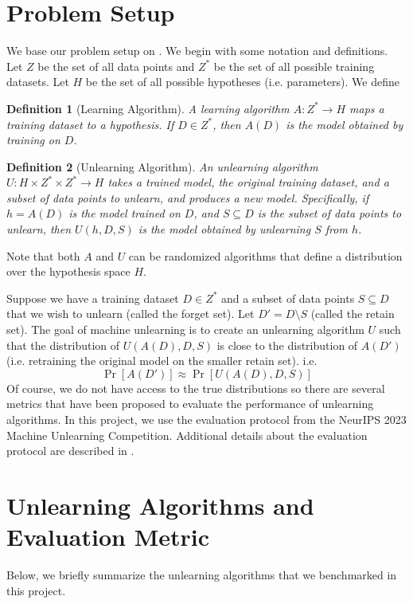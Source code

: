 \documentclass{article}
\newtheorem{definition}{Definition}[section]
\begin{document}
\section{Problem Setup} \label{sec:problem_setup}
We base our problem setup on \cite{li2025overview}. We begin with some notation and definitions. Let $Z$ be the set of all data points and $Z^*$ be the set of all possible training datasets. Let $H$ be the set of all possible hypotheses (i.e. parameters). We define
\begin{definition}[Learning Algorithm]
    A learning algorithm $A: Z^* \to H$ maps a training dataset to a hypothesis. If $D \in Z^*$, then $A(D)$ is the model obtained by training on $D$.
\end{definition}
\begin{definition}[Unlearning Algorithm]
    An unlearning algorithm $U: H \times Z^* \times Z^* \to H$ takes a trained model, the original training dataset, and a subset of data points to unlearn, and produces a new model. Specifically, if $h = A(D)$ is the model trained on $D$, and $S \subseteq D$ is the subset of data points to unlearn, then $U(h, D, S)$ is the model obtained by unlearning $S$ from $h$.
\end{definition}
Note that both $A$ and $U$ can be randomized algorithms that define a distribution over the hypothesis space $H$.

Suppose we have a training dataset $D \in Z^*$ and a subset of data points $S \subseteq D$ that we wish to unlearn (called the forget set). Let $D' = D \setminus S$ (called the retain set). The goal of machine unlearning is to create an unlearning algorithm $U$ such that the distribution of $U(A(D), D, S)$ is close to the distribution of $A(D')$ (i.e. retraining the original model on the smaller retain set).
i.e.
\begin{equation}
    \Pr[A(D')] \approx \Pr[U(A(D), D, S)]
\end{equation} 
Of course, we do not have access to the true distributions so there are several metrics that have been proposed to evaluate the performance of unlearning algorithms. In this project, we use the evaluation protocol from the NeurIPS 2023 Machine Unlearning Competition. Additional details about the evaluation protocol are described in .

\section{Unlearning Algorithms and Evaluation Metric}
Below, we briefly summarize the unlearning algorithms that we benchmarked in this project.
\end{document}
